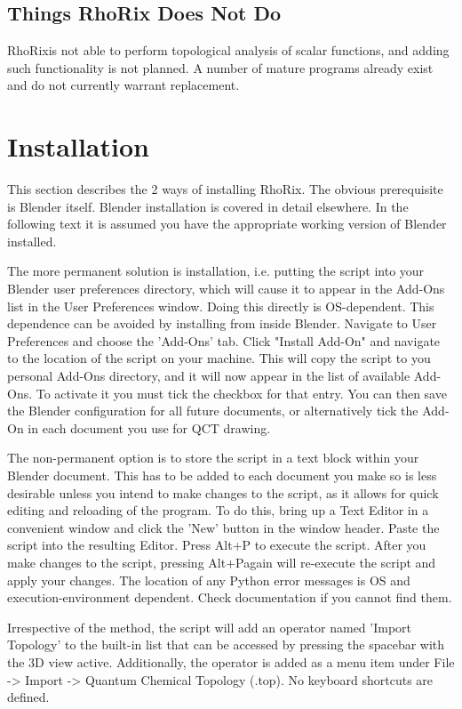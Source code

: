 \documentclass{tufte-book}
\newcommand{\programName}{RhoRix}
\newcommand{\executeCommand}{Alt+P}
\begin{document}
\section{Things \programName{} Does Not Do}

\programName is not able to perform topological analysis of scalar functions, and adding such functionality is not planned. A number of mature programs already exist and do not currently warrant replacement.

\chapter{Installation}

This section describes the 2 ways of installing \programName{}. The obvious prerequisite is Blender itself. 
Blender installation is covered in detail elsewhere.
In the following text it is assumed you have the appropriate working version of Blender installed.
\par{}
The more permanent solution is installation, i.e. putting the script into your Blender user preferences directory, which will cause it to appear in the Add-Ons list in the User Preferences window.
Doing this directly is OS-dependent.
This dependence can be avoided by installing from inside Blender.
Navigate to User Preferences and choose the 'Add-Ons' tab.
Click "Install Add-On" and navigate to the location of the script on your machine.
This will copy the script to you personal Add-Ons directory, and it will now appear in the list of available Add-Ons.
To activate it you must tick the checkbox for that entry. 
You can then save the Blender configuration for all future documents, or alternatively tick the Add-On in each document you use for QCT drawing.

The non-permanent option is to store the script in a text block within your Blender document. 
This has to be added to each document you make so is less desirable unless you intend to make changes to the script, as it allows for quick editing and reloading of the program.
To do this, bring up a Text Editor in a convenient window and click the 'New' button in the window header.
Paste the script into the resulting Editor.
Press \executeCommand{} to execute the script. 
After you make changes to the script, pressing \executeCommand again will re-execute the script and apply your changes. 
The location of any Python error messages is OS and execution-environment dependent.
Check documentation if you cannot find them.

Irrespective of the method, the script will add an operator named 'Import Topology' to the built-in list that can be accessed by pressing the spacebar with the 3D view active.
Additionally, the operator is added as a menu item under File -> Import -> Quantum Chemical Topology (.top).
No keyboard shortcuts are defined.
\end{document}

